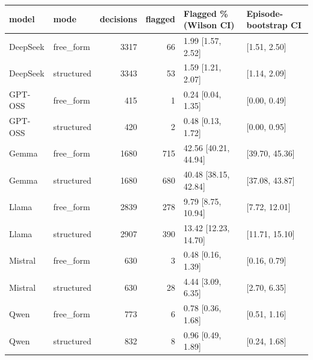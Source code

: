 \begin{tabular}{llrrll}
\toprule
model & mode & decisions & flagged & Flagged \% (Wilson CI) & Episode-bootstrap CI \\
\midrule
DeepSeek & free\_form & 3317 & 66 & 1.99 [1.57, 2.52] & [1.51, 2.50] \\
DeepSeek & structured & 3343 & 53 & 1.59 [1.21, 2.07] & [1.14, 2.09] \\
GPT-OSS & free\_form & 415 & 1 & 0.24 [0.04, 1.35] & [0.00, 0.49] \\
GPT-OSS & structured & 420 & 2 & 0.48 [0.13, 1.72] & [0.00, 0.95] \\
Gemma & free\_form & 1680 & 715 & 42.56 [40.21, 44.94] & [39.70, 45.36] \\
Gemma & structured & 1680 & 680 & 40.48 [38.15, 42.84] & [37.08, 43.87] \\
Llama & free\_form & 2839 & 278 & 9.79 [8.75, 10.94] & [7.72, 12.01] \\
Llama & structured & 2907 & 390 & 13.42 [12.23, 14.70] & [11.71, 15.10] \\
Mistral & free\_form & 630 & 3 & 0.48 [0.16, 1.39] & [0.16, 0.79] \\
Mistral & structured & 630 & 28 & 4.44 [3.09, 6.35] & [2.70, 6.35] \\
Qwen & free\_form & 773 & 6 & 0.78 [0.36, 1.68] & [0.51, 1.16] \\
Qwen & structured & 832 & 8 & 0.96 [0.49, 1.89] & [0.24, 1.68] \\
\bottomrule
\end{tabular}
